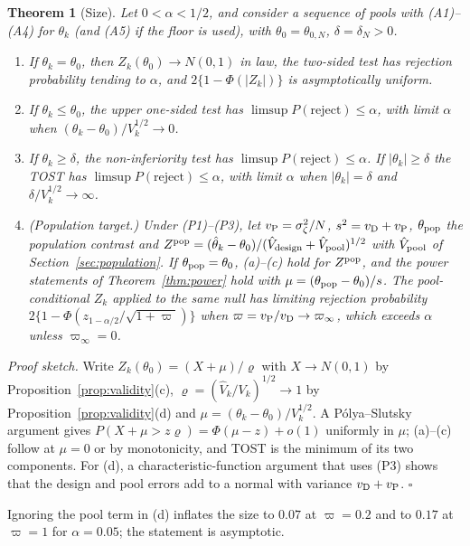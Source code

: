 \documentclass[pdflatex,sn-mathphys-num,iicol]{sn-jnl}
\theoremstyle{thmstyleone}
\newtheorem{theorem}[proposition]{Theorem}
\theoremstyle{thmstyletwo}
\theoremstyle{thmstylethree}
\begin{document}
\begin{theorem}[Size]\label{thm:size}
Let $0<\alpha<1/2$, and consider a sequence of pools with (A1)--(A4) for $\theta_k$ (and (A5) if the floor is used), with $\theta_0=\theta_{0,N}$, $\delta=\delta_N>0$.
\begin{enumerate}
\item[(a)] If $\theta_k=\theta_0$, then $Z_k(\theta_0)\to N(0,1)$ in law, the two-sided test has rejection probability tending to $\alpha$, and $2\{1-\Phi(|Z_k|)\}$ is asymptotically uniform.
\item[(b)] If $\theta_k\le\theta_0$, the upper one-sided test has $\limsup P(\text{reject})\le\alpha$, with limit $\alpha$ when $(\theta_k-\theta_0)/V_k^{1/2}\to0$.
\item[(c)] If $\theta_k\ge\delta$, the non-inferiority test has $\limsup P(\text{reject})\le\alpha$. If $|\theta_k|\ge\delta$ the TOST has $\limsup P(\text{reject})\le\alpha$, with limit $\alpha$ when $|\theta_k|=\delta$ and $\delta/V_k^{1/2}\to\infty$.
\item[(d)] (Population target.) Under (P1)--(P3), let $v_{\rm P}=\sigma^2_\zeta/N$, $s^2=v_{\rm D}+v_{\rm P}$, $\theta_{\rm pop}$ the population contrast and $Z^{\rm pop}=(\hat\theta_k-\theta_0)/(\hat V_{\rm design}+\hat V_{\rm pool})^{1/2}$ with $\hat V_{\rm pool}$ of Section~\ref{sec:population}. If $\theta_{\rm pop}=\theta_0$, (a)--(c) hold for $Z^{\rm pop}$, and the power statements of Theorem~\ref{thm:power} hold with $\mu=(\theta_{\rm pop}-\theta_0)/s$. The pool-conditional $Z_k$ applied to the same null has limiting rejection probability $2\{1-\Phi(z_{1-\alpha/2}/\sqrt{1+\varpi})\}$ when $\varpi=v_{\rm P}/v_{\rm D}\to\varpi_\infty$, which exceeds $\alpha$ unless $\varpi_\infty=0$.
\end{enumerate}
\end{theorem}

\emph{Proof sketch.} Write $Z_k(\theta_0)=(X+\mu)/\varrho$ with $X\to N(0,1)$ by Proposition~\ref{prop:validity}(c), $\varrho=(\hat V_k/V_k)^{1/2}\to1$ by Proposition~\ref{prop:validity}(d) and $\mu=(\theta_k-\theta_0)/V_k^{1/2}$. A P\'olya--Slutsky argument gives $P(X+\mu>z\varrho)=\Phi(\mu-z)+o(1)$ uniformly in $\mu$; (a)--(c) follow at $\mu=0$ or by monotonicity, and TOST is the minimum of its two components. For (d), a characteristic-function argument that uses (P3) shows that the design and pool errors add to a normal with variance $v_{\rm D}+v_{\rm P}$. $\square$

Ignoring the pool term in (d) inflates the size to $0.07$ at $\varpi=0.2$ and to $0.17$ at $\varpi=1$ for $\alpha=0.05$; the statement is asymptotic.
\end{document}
